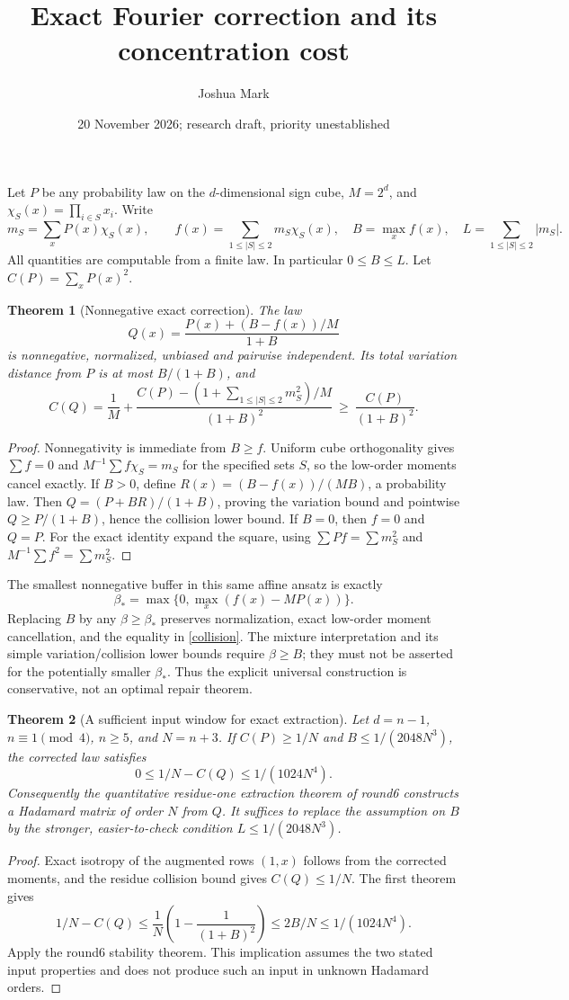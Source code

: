 \documentclass[11pt]{article}
\title{Exact Fourier correction and its concentration cost}
\author{Joshua Mark}
\date{20 November 2026; research draft, priority unestablished}
\newtheorem{theorem}{Theorem}
\begin{document}
\maketitle
Let $P$ be any probability law on the $d$-dimensional sign cube,
$M=2^d$, and $\chi_S(x)=\prod_{i\in S}x_i$. Write
\[
 m_S=\sum_xP(x)\chi_S(x),\qquad
 f(x)=\sum_{1\le|S|\le2}m_S\chi_S(x),\quad
 B=\max_x f(x),\quad L=\sum_{1\le|S|\le2}|m_S|.
\]
All quantities are computable from a finite law. In particular
$0\le B\le L$. Let $C(P)=\sum_xP(x)^2$.

\begin{theorem}[Nonnegative exact correction]
The law
\[
 Q(x)=\frac{P(x)+(B-f(x))/M}{1+B}
\]
is nonnegative, normalized, unbiased and pairwise independent. Its
total variation distance from $P$ is at most $B/(1+B)$, and
\begin{equation}\label{collision}
 C(Q)=\frac1M+
 \frac{C(P)-(1+\sum_{1\le|S|\le2}m_S^2)/M}{(1+B)^2}
 \ \ge\ \frac{C(P)}{(1+B)^2}.
\end{equation}
\end{theorem}
\begin{proof}
Nonnegativity is immediate from $B\ge f$. Uniform cube orthogonality
gives $\sum f=0$ and $M^{-1}\sum f\chi_S=m_S$ for the specified
sets $S$, so the low-order moments cancel exactly. If $B>0$, define
$R(x)=(B-f(x))/(MB)$, a probability law. Then
$Q=(P+BR)/(1+B)$, proving the variation bound and pointwise
$Q\ge P/(1+B)$, hence the collision lower bound. If $B=0$, then
$f=0$ and $Q=P$. For the exact identity expand the square, using
$\sum P f=\sum m_S^2$ and $M^{-1}\sum f^2=\sum m_S^2$.
\end{proof}

The smallest nonnegative buffer in this same affine ansatz is exactly
\[
 \beta_* =\max\{0,\max_x(f(x)-MP(x))\}.
\]
Replacing $B$ by any $\beta\ge\beta_*$ preserves normalization,
exact low-order moment cancellation, and the equality in
\eqref{collision}. The mixture interpretation and its simple
variation/collision lower bounds require $\beta\ge B$; they must not
be asserted for the potentially smaller $\beta_*$. Thus the explicit
universal construction is conservative, not an optimal repair theorem.

\begin{theorem}[A sufficient input window for exact extraction]
Let $d=n-1$, $n\equiv1\pmod4$, $n\ge5$, and $N=n+3$.
If $C(P)\ge1/N$ and $B\le1/(2048N^3)$, the corrected law satisfies
\[
 0\le1/N-C(Q)\le1/(1024N^4).
\]
Consequently the quantitative residue-one extraction theorem of round6
constructs a Hadamard matrix of order $N$ from $Q$.
It suffices to replace the assumption on $B$ by the stronger,
easier-to-check condition $L\le1/(2048N^3)$.
\end{theorem}
\begin{proof}
Exact isotropy of the augmented rows $(1,x)$ follows from the
corrected moments, and the residue collision bound gives $C(Q)\le1/N$.
The first theorem gives
\[
 1/N-C(Q)\le\frac1N\left(1-\frac1{(1+B)^2}\right)
 \le 2B/N\le1/(1024N^4).
\]
Apply the round6 stability theorem. This implication assumes the two
stated input properties and does not produce such an input in unknown
Hadamard orders.
\end{proof}
\end{document}
